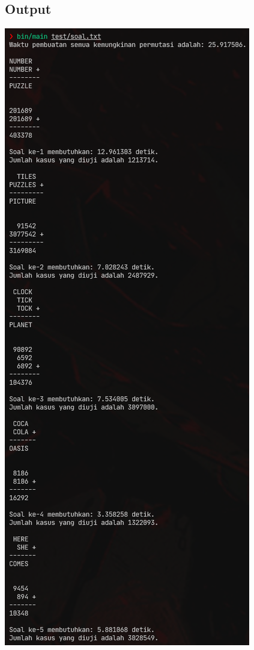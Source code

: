\documentclass{article}
\let\origfigure\figure
\let\endorigfigure\endfigure
\renewenvironment{figure}[1][2] {
    \expandafter\origfigure\expandafter[H]
} {
    \endorigfigure
}
\begin{document}
\subsection{Output}
\begin{figure}
  \includegraphics{stima-ss-1.png}
  \caption{Luaran program dekripsi untuk bagian permutasi dan soal 1 sampai 5}
\end{figure}
\end{document}
